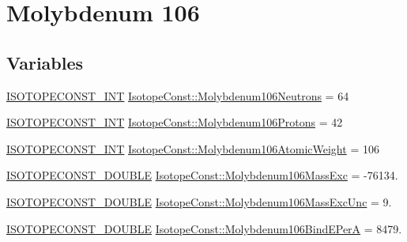 \hypertarget{group___isotope_const-_molybdenum-_mo106}{}\section{Molybdenum 106}
\label{group___isotope_const-_molybdenum-_mo106}
\subsection*{Variables}
\begin{DoxyCompactItemize}
\item 
\mbox{\hyperlink{group___isotope_const-_macros_ga5f18360b3e99483a35c32d789e62621c}{I\+S\+O\+T\+O\+P\+E\+C\+O\+N\+S\+T\+\_\+\+I\+NT}} \mbox{\hyperlink{group___isotope_const-_molybdenum-_mo106_gaf95ac21e07743982f8dc5e63daadfac1}{Isotope\+Const\+::\+Molybdenum106\+Neutrons}} = 64
\item 
\mbox{\hyperlink{group___isotope_const-_macros_ga5f18360b3e99483a35c32d789e62621c}{I\+S\+O\+T\+O\+P\+E\+C\+O\+N\+S\+T\+\_\+\+I\+NT}} \mbox{\hyperlink{group___isotope_const-_molybdenum-_mo106_ga1fc7477dfcd64217656e9efe30e9bcca}{Isotope\+Const\+::\+Molybdenum106\+Protons}} = 42
\item 
\mbox{\hyperlink{group___isotope_const-_macros_ga5f18360b3e99483a35c32d789e62621c}{I\+S\+O\+T\+O\+P\+E\+C\+O\+N\+S\+T\+\_\+\+I\+NT}} \mbox{\hyperlink{group___isotope_const-_molybdenum-_mo106_ga99a3e82ac609f301d9410e3c2fbec28f}{Isotope\+Const\+::\+Molybdenum106\+Atomic\+Weight}} = 106
\item 
\mbox{\hyperlink{group___isotope_const-_macros_ga8f45a7272ce02c0b4c65c44636ed719a}{I\+S\+O\+T\+O\+P\+E\+C\+O\+N\+S\+T\+\_\+\+D\+O\+U\+B\+LE}} \mbox{\hyperlink{group___isotope_const-_molybdenum-_mo106_ga5e03932842d80d010b9fc00aae5c9662}{Isotope\+Const\+::\+Molybdenum106\+Mass\+Exc}} = -\/76134.
\item 
\mbox{\hyperlink{group___isotope_const-_macros_ga8f45a7272ce02c0b4c65c44636ed719a}{I\+S\+O\+T\+O\+P\+E\+C\+O\+N\+S\+T\+\_\+\+D\+O\+U\+B\+LE}} \mbox{\hyperlink{group___isotope_const-_molybdenum-_mo106_ga4927a052473e2c383dc335664b449351}{Isotope\+Const\+::\+Molybdenum106\+Mass\+Exc\+Unc}} = 9.
\item 
\mbox{\hyperlink{group___isotope_const-_macros_ga8f45a7272ce02c0b4c65c44636ed719a}{I\+S\+O\+T\+O\+P\+E\+C\+O\+N\+S\+T\+\_\+\+D\+O\+U\+B\+LE}} \mbox{\hyperlink{group___isotope_const-_molybdenum-_mo106_gaef559462a47aec1d39e90cae085280f0}{Isotope\+Const\+::\+Molybdenum106\+Bind\+E\+PerA}} = 8479.
\item 

\end{DoxyCompactItemize}
